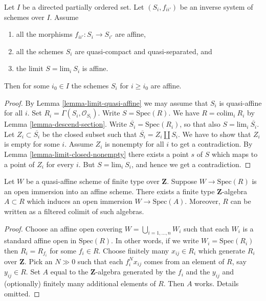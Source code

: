 \begin{lemma}
\label{lemma-limit-affine}
Let $I$ be a directed partially ordered set.
Let $(S_i, f_{ii'})$ be an inverse system of
schemes over $I$. Assume
\begin{enumerate}
\item all the morphisms $f_{ii'} : S_i \to S_{i'}$ are affine,
\item all the schemes $S_i$ are quasi-compact and quasi-separated, and
\item the limit $S = \text{lim}_i\ S_i$ is affine.
\end{enumerate}
Then for some $i_0 \in I$ the schemes $S_i$ for $i \geq i_0$
are affine.
\end{lemma}

\begin{proof}
By Lemma \ref{lemma-limit-quasi-affine} we may assume that
$S_i$ is quasi-affine for all $i$. Set $R_i = \Gamma(S_i, \mathcal{O}_{S_i})$.
Write $S = \text{Spec}(R)$. We have $R = \text{colim}_i\ R_i$
by Lemma \ref{lemma-descend-section}.
Write $\overline{S_i} = \text{Spec}(R_i)$, so that also
$S = \text{lim}_i\ \overline{S_i}$. Let $Z_i \subset \overline{S_i}$
be the closed subset such that
$\overline{S_i} = Z_i \coprod S_i$.
We have to show that $Z_i$ is empty for some $i$.
Assume $Z_i$ is nonempty for all $i$ to get a contradiction.
By Lemma \ref{lemma-limit-closed-nonempty} there exists
a point $s$ of $S$ which maps to a point of $Z_i$ for every $i$.
But $S = \text{lim}_i\ S_i$, and hence we get a contradiction.
\end{proof}

\begin{lemma}
\label{lemma-quasi-affine-finite-type-over-Z}
Let $W$ be a quasi-affine scheme of finite type over
$\mathbf{Z}$. Suppose $W \to \text{Spec}(R)$ is an
open immersion into an affine scheme. There exists a
finite type $\mathbf{Z}$-algebra $A \subset R$
which induces an open immersion $W \to \text{Spec}(A)$.
Moreover, $R$ can be written as a filtered colimit
of such algebras.
\end{lemma}

\begin{proof}
Choose an affine open covering $W = \bigcup_{i = 1, \ldots, n} W_i$
such that each $W_i$ is a standard affine open in $\text{Spec}(R)$.
In other words, if we write $W_i = \text{Spec}(R_i)$
then $R_i = R_{f_i}$ for some $f_i \in R$.
Choose finitely many $x_{ij} \in R_i$ which generate
$R_i$ over $\mathbf{Z}$.
Pick an $N \gg 0$ such that each $f_i^Nx_{ij}$ comes from an
element of $R$, say $y_{ij} \in R$.
Set $A$ equal to the $\mathbf{Z}$-algebra generated by
the $f_i$ and the $y_{ij}$ and (optionally) finitely many
additional elements of $R$. Then $A$ works. Details omitted.
\end{proof}

